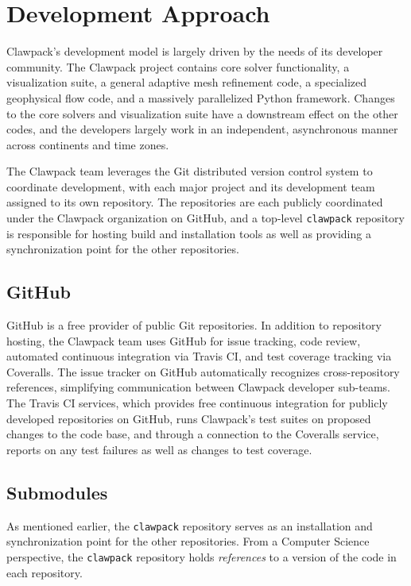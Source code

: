 %
%
%

\section{Development Approach}

Clawpack's development model is largely driven by the needs of its
developer community.  The Clawpack project contains core solver
functionality, a visualization suite, a general adaptive mesh
refinement code, a specialized geophysical flow code, and a
massively parallelized Python framework.  Changes to the core solvers
and visualization suite have a downstream effect on the other codes,
and the developers largely work in an independent, asynchronous manner
across continents and time zones. 

The Clawpack team leverages the Git distributed version control system
to coordinate development, with each major project and its development
team assigned to its own repository.  The repositories are each
publicly coordinated under the Clawpack organization on GitHub, and a
top-level \texttt{clawpack} repository is responsible for hosting
build and installation tools as well as providing a synchronization
point for the other repositories.

\subsection{GitHub}

GitHub is a free provider of public Git repositories.  In addition to
repository hosting, the Clawpack team uses GitHub for issue tracking,
code review, automated continuous integration via Travis CI, and test
coverage tracking via Coveralls.  The issue tracker on GitHub
automatically recognizes cross-repository references, simplifying
communication between Clawpack developer sub-teams.  The Travis CI
services, which provides free continuous integration for publicly
developed repositories on GitHub, runs Clawpack's test suites on
proposed changes to the code base, and through a connection to
the Coveralls service, reports on any test failures as well as changes
to test coverage.

\subsection{Submodules}

As mentioned earlier, the \texttt{clawpack} repository serves as an
installation and synchronization point for the other repositories.
From a Computer Science perspective, the \texttt{clawpack} repository
holds \textit{references} to a version of the code in each
repository.  

